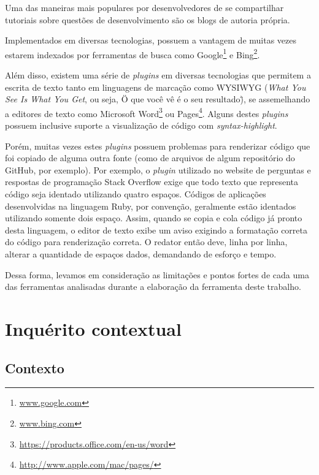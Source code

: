 Uma das maneiras mais populares por desenvolvedores de se compartilhar tutoriais sobre questões de desenvolvimento são os blogs de autoria própria.

Implementados em diversas tecnologias, possuem a vantagem de muitas vezes estarem indexados por ferramentas de busca como Google\footnote{\url{www.google.com}} e Bing\footnote{\url{www.bing.com}}.

Além disso, existem uma série de \textit{plugins} em diversas tecnologias que permitem a escrita de texto tanto em linguagens de marcação como WYSIWYG (\textit{What You See Is What You Get}, ou seja, \"O que você vê é o seu resultado\"), se assemelhando a editores de texto como Microsoft Word\footnote{\url{https://products.office.com/en-us/word}} ou Pages\footnote{\url{http://www.apple.com/mac/pages/}}. Alguns destes \textit{plugins} possuem inclusive suporte a visualização de código com \textit{syntax-highlight}.

Porém, muitas vezes estes \textit{plugins} possuem problemas para renderizar código que foi copiado de alguma outra fonte (como de arquivos de algum repositório do GitHub, por exemplo). Por exemplo, o \textit{plugin} utilizado no website de perguntas e respostas de programação Stack Overflow exige que todo texto que representa código seja identado utilizando quatro espaços. Códigos de aplicações desenvolvidas na linguagem Ruby, por convenção, geralmente estão identados utilizando somente dois espaço. Assim, quando se copia e cola código já pronto desta linguagem, o editor de texto exibe um aviso exigindo a formatação correta do código para renderização correta. O redator então deve, linha por linha, alterar a quantidade de espaços dados, demandando de esforço e tempo.


Dessa forma, levamos em consideração as limitações e pontos fortes de cada uma das ferramentas analisadas durante a elaboração da ferramenta deste trabalho.

\section{Inquérito contextual}


\subsection{Contexto}

